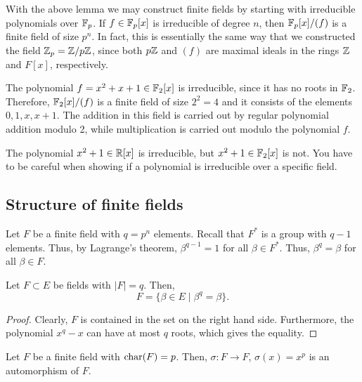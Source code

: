 \documentclass[../main.tex]{subfiles}
\begin{document}
With the above lemma we may construct finite fields by starting with irreducible polynomials over $\mathbb{F}_p$. If $f \in \mathbb{F}_p[x]$ is irreducible of degree $n$, then $\mathbb{F}_p[x] / (f)$ is a finite field of size $p^n$. In fact, this is essentially the same way that we constructed the field $\mathbb{Z}_p = \mathbb{Z} / p\mathbb{Z}$, since both $p\mathbb{Z}$ and $(f)$ are maximal ideals in the rings $\mathbb{Z}$ and $F[x]$, respectively.

\begin{example}
The polynomial $f = x^2 + x + 1 \in \mathbb{F}_2[x]$ is irreducible, since it has no roots in $\mathbb{F}_2$. Therefore, $\mathbb{F}_2[x] / (f)$ is a finite field of size $2^2 = 4$ and it consists of the elements $0, 1, x, x + 1$. The addition in this field is carried out by regular polynomial addition modulo 2, while multiplication is carried out modulo the polynomial $f$.
\end{example}

\begin{example}
The polynomial $x^2 + 1 \in \mathbb{R}[x]$ is irreducible, but $x^2 + 1 \in \mathbb{F}_2[x]$ is not. You have to be careful when showing if a polynomial is irreducible over a specific field.
\end{example}

\subsection{Structure of finite fields}

Let $F$ be a finite field with $q = p^n$ elements. Recall that $F^*$ is a group with $q - 1$ elements. Thus, by Lagrange's theorem, $\beta^{q - 1} = 1$ for all $\beta \in F^*$. Thus, $\beta^q = \beta$ for all $\beta \in F$.

\begin{lemma}\label{lem:unique_subfield}
Let $F \subset E$ be fields with $\lvert F \rvert = q$. Then,
\begin{equation*}
    F = \{\beta \in E \mid \beta^q = \beta \}.
\end{equation*}
\end{lemma}

\begin{proof}
Clearly, $F$ is contained in the set on the right hand side. Furthermore, the polynomial $x^q - x$ can have at most $q$ roots, which gives the equality.
\end{proof}

\begin{lemma}\label{lem:Frobenius_automorphism}
Let $F$ be a finite field with $\operatorname{char}(F) = p$. Then, $\sigma \colon F \to F$, $\sigma(x) = x^p$ is an automorphism of $F$.
\end{lemma}
\end{document}
